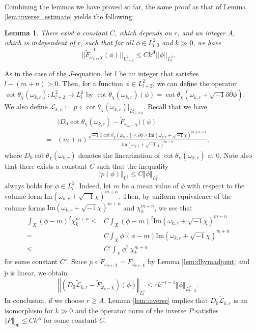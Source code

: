 \documentclass{amsart}
\numberwithin{equation}{section}
\theoremstyle{plain}
\newtheorem{lemma}[equation]{Lemma}
\theoremstyle{definition}
\theoremstyle{remark}
\begin{document}
Combining the lemmas we have proved so far, the same proof as that of Lemma \ref{lem:inverse_estimate} yields the following:

\begin{lemma}
    There exist a constant $C$, which depends on $r$, and an integer A, which is independent of $r$,
    such that for all $\phi \in L^2_{l,0}$ and $k \gg 0$, we have
    $$ ||\tilde{F}_{\omega_{k,r}, \chi}^{-1} (\phi)||_{L^2_{l+2}}
    \le Ck^A ||\phi||_{L^2_l}.$$
\end{lemma}

As in the case of the $J$-equation, let $l$ be an integer that satisfies $l-(m+n)>0$. Then, for a function $\phi\in L^2_{l+2}$, we can define the operator $\cot\theta_\chi(\omega_{k,r}):L^2_{l+2}\to L^2_l$ by $\cot\theta_\chi(\omega_{k,r})(\phi)=\cot\theta_\chi(\omega_{k,r}+\sqrt{-1}\partial\bar{\partial}\phi)$. We also define $\tilde{\mathcal{L}}_{k,r}:=\tilde{p}\, \circ\, \cot\theta_{\chi}(\omega_{k,r})|_{L^2_{l+2,0}}$. Recall that we have
\begin{align*}
    &\Big(D_0\cot\theta_\chi(\omega_{k,r})-\tilde{F}_{\omega_{k,r},\chi}\Big)(\phi)\\
    =&(m+n)\frac{\sqrt{-1}\partial\cot\theta_\chi(\omega_{k,r})\wedge\bar{\partial}\phi\wedge\mathrm{Im}(\omega_{k,r}+\sqrt{-1}\chi)^{m+n-1}}{\mathrm{Im}(\omega_{k,r}+\sqrt{-1}\chi)^{m+n}},
\end{align*}
where $D_0\cot\theta_\chi(\omega_{k,r})$ denotes the linearization of $\cot\theta_\chi(\omega_{k,r})$ at $0$. Note also that there exists a constant $C$ such that the inequality
$$\Vert\tilde{p}(\phi)\Vert_{L^2_l}\le C\Vert\phi\Vert_{L^2_l}$$
always holds for $\phi\in L^2_l$. Indeed, let $m$ be a mean value of $\phi$ with respect to the volume form $\mathrm{Im}(\omega_{k,r}+\sqrt{-1}\chi)^{m+n}$. Then, by uniform equivalence of the volume forms $\mathrm{Im}(\omega_{k,r}+\sqrt{-1}\chi)^{m+n}$ and $\chi_k^{m+n}$, we see that
\begin{align*}
    \int_X(\phi-m)^2\chi_k^{m+n}\le &C\int_X(\phi-m)^2\mathrm{Im}(\omega_{k,r}+\sqrt{-1}\chi)^{m+n} \\
    = &C\int_X \phi\, (\phi-m)\mathrm{Im}(\omega_{k,r}+\sqrt{-1}\chi)^{m+n}\\
    \le&C'\int_X\phi^2 \,\chi_k^{m+n}
\end{align*}
for some constant $C'$.
Since $\tilde{p}\, \circ\, \tilde{F}_{\omega_{k,r},\chi}=\tilde{F}_{\omega_{k,r},\chi}$ by  Lemma \ref{lem:dhymadjoint} and $\tilde{p}$ is linear, we obtain
$$\left\Vert(D_0\tilde{\mathcal{L}}_{k,r}-\tilde{F}_{\omega_{k,r},\chi})(\phi)\right\Vert_{L^2_l}\le ck^{-r-1}\left\Vert\phi\right\Vert_{L^2_{l+2}}.$$
In conclusion, if we choose $r\ge A$, Lemma \ref{lem:inverse} implies that $D_0\tilde{\mathcal{L}}_{k,r}$ is an isomorphism for $k\gg0$ and the operator norm of the inverse $P$ satisfies $\Vert P\Vert_{\mathrm{op}}\le Ck^A$ for some constant $C$.
\end{document}
